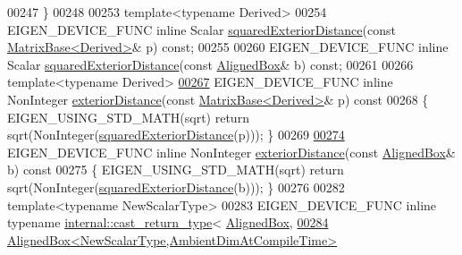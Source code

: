 \begin{DoxyCode}
00247   \}
00248 
00253   \textcolor{keyword}{template}<\textcolor{keyword}{typename} Derived>
00254   EIGEN\_DEVICE\_FUNC \textcolor{keyword}{inline} Scalar \hyperlink{group___geometry___module_aa6d9ffc81bd77da631fef6559f45cf13}{squaredExteriorDistance}(\textcolor{keyword}{const} 
      \hyperlink{group___core___module_class_eigen_1_1_matrix_base}{MatrixBase<Derived>}& p) \textcolor{keyword}{const};
00255 
00260   EIGEN\_DEVICE\_FUNC \textcolor{keyword}{inline} Scalar \hyperlink{group___geometry___module_aa6d9ffc81bd77da631fef6559f45cf13}{squaredExteriorDistance}(\textcolor{keyword}{const} 
      \hyperlink{group___geometry___module_class_eigen_1_1_aligned_box}{AlignedBox}& b) \textcolor{keyword}{const};
00261 
00266   \textcolor{keyword}{template}<\textcolor{keyword}{typename} Derived>
\hyperlink{group___geometry___module_afe02b2ef5cdc1e1cd45eddee33cf1be5}{00267}   EIGEN\_DEVICE\_FUNC \textcolor{keyword}{inline} NonInteger \hyperlink{group___geometry___module_afe02b2ef5cdc1e1cd45eddee33cf1be5}{exteriorDistance}(\textcolor{keyword}{const} 
      \hyperlink{group___core___module_class_eigen_1_1_matrix_base}{MatrixBase<Derived>}& p)\textcolor{keyword}{ const}
00268 \textcolor{keyword}{  }\{ EIGEN\_USING\_STD\_MATH(sqrt) \textcolor{keywordflow}{return} sqrt(NonInteger(\hyperlink{group___geometry___module_aa6d9ffc81bd77da631fef6559f45cf13}{squaredExteriorDistance}(p))); 
      \}
00269 
\hyperlink{group___geometry___module_adf8c0e000b283ad22f00474356916686}{00274}   EIGEN\_DEVICE\_FUNC \textcolor{keyword}{inline} NonInteger \hyperlink{group___geometry___module_adf8c0e000b283ad22f00474356916686}{exteriorDistance}(\textcolor{keyword}{const} 
      \hyperlink{group___geometry___module_class_eigen_1_1_aligned_box}{AlignedBox}& b)\textcolor{keyword}{ const}
00275 \textcolor{keyword}{  }\{ EIGEN\_USING\_STD\_MATH(sqrt) \textcolor{keywordflow}{return} sqrt(NonInteger(\hyperlink{group___geometry___module_aa6d9ffc81bd77da631fef6559f45cf13}{squaredExteriorDistance}(b))); 
      \}
00276 
00282   \textcolor{keyword}{template}<\textcolor{keyword}{typename} NewScalarType>
00283   EIGEN\_DEVICE\_FUNC \textcolor{keyword}{inline} \textcolor{keyword}{typename} \hyperlink{struct_eigen_1_1internal_1_1cast__return__type}{internal::cast\_return\_type}<
      \hyperlink{group___geometry___module_aeb7682d3d8676752e9b789b51d950872}{AlignedBox},
\hyperlink{group___geometry___module_a269eb719d3e093d9c1cb4309b815c51b}{00284}            \hyperlink{group___geometry___module_class_eigen_1_1_aligned_box}{AlignedBox<NewScalarType,AmbientDimAtCompileTime>}

\end{DoxyCode}
